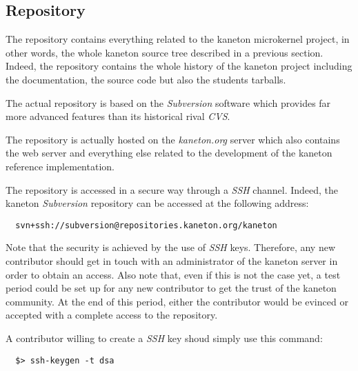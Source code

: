 %
%
%
%
%
%

%
%

\subsection{Repository}

The repository contains everything related to the kaneton microkernel
project, in other words, the whole kaneton source tree described in a
previous section. Indeed, the repository contains the whole history
of the kaneton project including the documentation, the source code
but also the students tarballs.

The actual repository is based on the \textit{Subversion} software which
provides far more advanced features than its historical rival \textit{CVS}.

The repository is actually hosted on the \textit{kaneton.org} server which
also contains the web server and everything else related to the development
of the kaneton reference implementation.

The repository is accessed in a secure way through a \textit{SSH} channel.
Indeed, the kaneton \textit{Subversion} repository can be accessed at the
following address:

\begin{verbatim}
  svn+ssh://subversion@repositories.kaneton.org/kaneton
\end{verbatim}

Note that the security is achieved by the use of \textit{SSH} keys. Therefore,
any new contributor should get in touch with an administrator of the
kaneton server in order to obtain an access. Also note that, even if this is
not the case yet, a test period could be set up for any new contributor
to get the trust of the kaneton community. At the end of this period,
either the contributor would be evinced or accepted with a complete access to
the repository.

A contributor willing to create a \textit{SSH} key shoud simply use this
command:

\begin{verbatim}
  $> ssh-keygen -t dsa
\end{verbatim}

